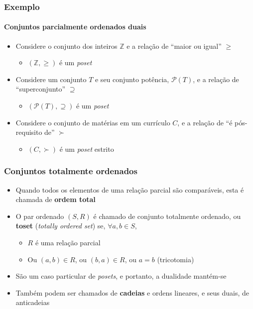\documentclass[12pt]{beamer}
\begin{document}
\begin{frame}
  \frametitle{Exemplo}
  \framesubtitle{Conjuntos parcialmente ordenados duais}
  \begin{itemize}
    \item<1-> Considere o conjunto dos inteiros $\mathbb{Z}$ e a relação de
        ``maior ou igual'' $\geq$
    \begin{itemize}
      \item<2-> $(\mathbb{Z}, \geq)$ é um \emph{poset}
    \end{itemize}
    \item<3-> Considere um conjunto $T$ e seu conjunto potência,
        $\mathcal{P}(T)$, e a relação de ``superconjunto'' $\supseteq$
    \begin{itemize}
      \item<4-> $(\mathcal{P}(T), \supseteq)$ é um \emph{poset}
    \end{itemize}
    \item<5-> Considere o conjunto de matérias em um currículo $C$, e a relação
        de ``é pós-requisito de'' $\succ$
    \begin{itemize}
      \item<6-> $(C, \succ)$ é um \emph{poset} estrito
    \end{itemize}
  \end{itemize}
\end{frame}

\begin{frame}
  \frametitle{Conjuntos totalmente ordenados}
  \begin{itemize}
    \item Quando todos os elementos de uma relação parcial são comparáveis,
        esta é chamada de \textbf{ordem total}
    \item<1-> O par ordenado $(S, R)$ é chamado de conjunto totalmente
        ordenado, ou \textbf{toset} (\emph{totally ordered set}) se, $\forall
          a, b \in S$,
    \begin{itemize}[itemsep=0pt]
      \item<2-> $R$ é uma relação parcial
      \item<3-> Ou $(a, b) \in R$, ou $(b, a) \in R$, ou $a = b$ (tricotomia)
    \end{itemize}
    \item São um caso particular de \emph{posets}, e portanto, a dualidade
        mantém-se
    \item Também podem ser chamados de \textbf{cadeias} e ordens lineares, e
        seus duais, de anticadeias
  \end{itemize}
\end{frame}
\end{document}
